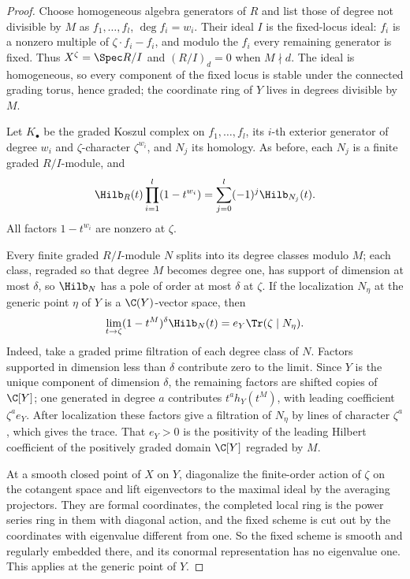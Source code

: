 \begin{proof}
Choose homogeneous algebra generators of $R$ and list those of degree not
divisible by $M$ as $f_1,\dots,f_l$, $\deg f_i=w_i$. Their ideal $I$ is the
fixed-locus ideal: $f_i$ is a nonzero multiple of $\zeta\cdot f_i-f_i$, and
modulo the $f_i$ every remaining generator is fixed. Thus $X^\zeta=\Spec R/I$
and $(R/I)_d=0$ when $M\nmid d$. The ideal is homogeneous, so every component
of the fixed locus is stable under the connected grading torus, hence graded;
the coordinate ring of $Y$ lives in degrees divisible by $M$.

Let $K_\bullet$ be the graded Koszul complex on $f_1,\dots,f_l$, its $i$-th
exterior generator of degree $w_i$ and $\zeta$-character $\zeta^{w_i}$, and
$N_j$ its homology. As before, each $N_j$ is a finite graded $R/I$-module, and
\begin{equation}\label{eq:euler}
 \Hilb_R(t)\prod_{i=1}^l(1-t^{w_i})=\sum_{j=0}^l(-1)^j\Hilb_{N_j}(t).
\end{equation}
All factors $1-t^{w_i}$ are nonzero at $\zeta$.

Every finite graded $R/I$-module $N$ splits into its degree classes modulo
$M$; each class, regraded so that degree $M$ becomes degree one, has support
of dimension at most $\delta$, so $\Hilb_N$ has a pole of order at most
$\delta$ at $\zeta$. If the localization $N_\eta$ at the generic point $\eta$
of $Y$ is a $\C(Y)$-vector space, then
\begin{equation}\label{eq:leading}
 \lim_{t\to\zeta}(1-t^M)^\delta\Hilb_N(t)=e_Y\Tr(\zeta\mid N_\eta).
\end{equation}
Indeed, take a graded prime filtration of each degree class of $N$. Factors
supported in dimension less than $\delta$ contribute zero to the limit. Since
$Y$ is the unique component of dimension $\delta$, the remaining factors are
shifted copies of $\C[Y]$; one generated in degree $a$ contributes
$t^ah_Y(t^M)$, with leading coefficient $\zeta^ae_Y$. After localization
these factors give a filtration of $N_\eta$ by lines of character $\zeta^a$,
which gives the trace. That $e_Y>0$ is the positivity of the leading Hilbert
coefficient of the positively graded domain $\C[Y]$ regraded by $M$.

At a smooth closed point of $X$ on $Y$, diagonalize the finite-order action of
$\zeta$ on the cotangent space and lift eigenvectors to the maximal ideal by
the averaging projectors. They are formal coordinates, the completed local
ring is the power series ring in them with diagonal action, and the fixed
scheme is cut out by the coordinates with eigenvalue different from one. So
the fixed scheme is smooth and regularly embedded there, and its conormal
representation has no eigenvalue one. This applies at the generic point of
$Y$.


\end{proof}
